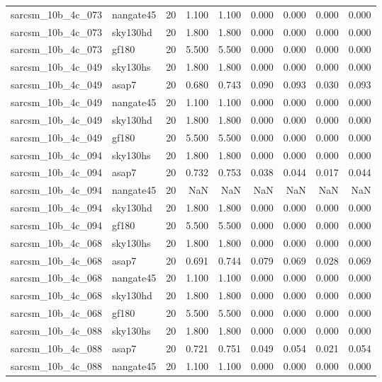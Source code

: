 \begin{tabular}{llrrrrrrr}
sarcsm\_10b\_4c\_073 & nangate45 & 20 & 1.100 & 1.100 & 0.000 & 0.000 & 0.000 & 0.000 \\
sarcsm\_10b\_4c\_073 & sky130hd & 20 & 1.800 & 1.800 & 0.000 & 0.000 & 0.000 & 0.000 \\
sarcsm\_10b\_4c\_073 & gf180 & 20 & 5.500 & 5.500 & 0.000 & 0.000 & 0.000 & 0.000 \\
sarcsm\_10b\_4c\_049 & sky130hs & 20 & 1.800 & 1.800 & 0.000 & 0.000 & 0.000 & 0.000 \\
sarcsm\_10b\_4c\_049 & asap7 & 20 & 0.680 & 0.743 & 0.090 & 0.093 & 0.030 & 0.093 \\
sarcsm\_10b\_4c\_049 & nangate45 & 20 & 1.100 & 1.100 & 0.000 & 0.000 & 0.000 & 0.000 \\
sarcsm\_10b\_4c\_049 & sky130hd & 20 & 1.800 & 1.800 & 0.000 & 0.000 & 0.000 & 0.000 \\
sarcsm\_10b\_4c\_049 & gf180 & 20 & 5.500 & 5.500 & 0.000 & 0.000 & 0.000 & 0.000 \\
sarcsm\_10b\_4c\_094 & sky130hs & 20 & 1.800 & 1.800 & 0.000 & 0.000 & 0.000 & 0.000 \\
sarcsm\_10b\_4c\_094 & asap7 & 20 & 0.732 & 0.753 & 0.038 & 0.044 & 0.017 & 0.044 \\
sarcsm\_10b\_4c\_094 & nangate45 & 20 & NaN & NaN & NaN & NaN & NaN & NaN \\
sarcsm\_10b\_4c\_094 & sky130hd & 20 & 1.800 & 1.800 & 0.000 & 0.000 & 0.000 & 0.000 \\
sarcsm\_10b\_4c\_094 & gf180 & 20 & 5.500 & 5.500 & 0.000 & 0.000 & 0.000 & 0.000 \\
sarcsm\_10b\_4c\_068 & sky130hs & 20 & 1.800 & 1.800 & 0.000 & 0.000 & 0.000 & 0.000 \\
sarcsm\_10b\_4c\_068 & asap7 & 20 & 0.691 & 0.744 & 0.079 & 0.069 & 0.028 & 0.069 \\
sarcsm\_10b\_4c\_068 & nangate45 & 20 & 1.100 & 1.100 & 0.000 & 0.000 & 0.000 & 0.000 \\
sarcsm\_10b\_4c\_068 & sky130hd & 20 & 1.800 & 1.800 & 0.000 & 0.000 & 0.000 & 0.000 \\
sarcsm\_10b\_4c\_068 & gf180 & 20 & 5.500 & 5.500 & 0.000 & 0.000 & 0.000 & 0.000 \\
sarcsm\_10b\_4c\_088 & sky130hs & 20 & 1.800 & 1.800 & 0.000 & 0.000 & 0.000 & 0.000 \\
sarcsm\_10b\_4c\_088 & asap7 & 20 & 0.721 & 0.751 & 0.049 & 0.054 & 0.021 & 0.054 \\
sarcsm\_10b\_4c\_088 & nangate45 & 20 & 1.100 & 1.100 & 0.000 & 0.000 & 0.000 & 0.000 \\

\end{tabular}
